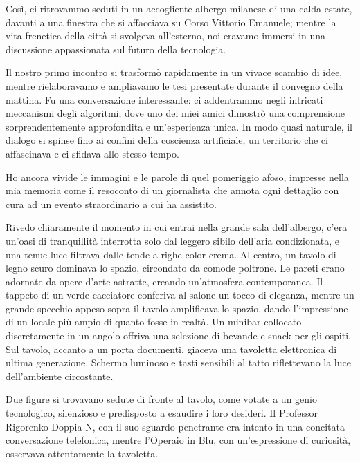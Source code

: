 \documentclass[12pt,b5paper]{article}
\begin{document}
Così, ci ritrovammo seduti in un accogliente albergo milanese di una calda 
estate, davanti a una finestra che si affacciava su Corso Vittorio Emanuele;
mentre la vita frenetica della città si svolgeva all'esterno, noi eravamo
immersi in una discussione appassionata sul futuro della tecnologia. 

Il nostro primo incontro si trasformò rapidamente in un vivace scambio di idee,
mentre rielaboravamo e ampliavamo le tesi presentate durante il convegno della
mattina. Fu una conversazione interessante: ci addentrammo negli intricati
meccanismi degli algoritmi, dove uno dei miei amici dimostrò una comprensione
sorprendentemente approfondita e un'esperienza unica. In modo quasi naturale,
il dialogo si spinse fino ai confini della coscienza artificiale, un
territorio che ci affascinava e ci sfidava allo stesso tempo. 

Ho ancora vivide le immagini e le parole di quel pomeriggio afoso, impresse
nella mia memoria come il resoconto di un giornalista che annota ogni dettaglio
con cura ad un evento straordinario a cui ha assistito.

Rivedo chiaramente il momento in cui entrai nella grande sala dell'albergo, 
c'era un'oasi di tranquillità interrotta solo dal leggero sibilo dell'aria
condizionata, e una tenue luce filtrava dalle tende a righe color crema.
Al centro, un tavolo di legno scuro dominava lo spazio, circondato da comode
poltrone. Le pareti erano adornate da opere d'arte astratte, creando un'atmosfera
contemporanea. Il tappeto di un verde cacciatore conferiva al salone un tocco di
eleganza, mentre un grande specchio appeso sopra il tavolo amplificava lo spazio,
dando l'impressione di un locale più ampio di quanto fosse in realtà. Un minibar
collocato discretamente in un angolo offriva una selezione di bevande e snack
per gli ospiti. Sul tavolo, accanto a un porta documenti, giaceva una
tavoletta elettronica di ultima generazione. Schermo luminoso e tasti sensibili
al tatto riflettevano la luce dell'ambiente circostante. 

Due figure si trovavano sedute di fronte al tavolo, come votate a un genio
tecnologico, silenzioso e predisposto a esaudire i loro desideri. Il Professor Rigorenko
Doppia N, con il suo sguardo penetrante era intento in una concitata conversazione
telefonica, mentre l'Operaio in Blu, con un'espressione di curiosità, osservava
attentamente la tavoletta.
\end{document}

